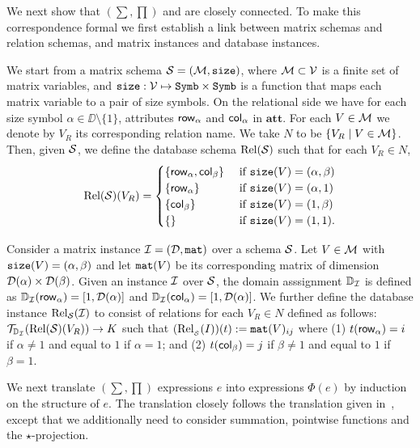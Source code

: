 \newcommand{\remark}[1]{\textcolor{darkgray}{\bf Remark: }\textcolor{gray}{#1} }
We next show that \lang$(\sum,\prod)$ and \ARA are closely connected. To make this correspondence formal we first establish a link between matrix schemas and relation schemas, and matrix instances and database instances. 

We start from a matrix schema $\mathcal{S}=(\mathcal{M},\texttt{size})$, where $\mathcal{M}\subset \mathcal{V}$ is a finite set of matrix variables, and $\texttt{size}: \mathcal{V} \mapsto \texttt{Symb}\times \texttt{Symb}$ is a function that maps each matrix variable to a pair of size symbols. On the relational side
we have for each size symbol $\alpha\in\DD\setminus\{1\}$, attributes $\mathsf{row}_\alpha$ and $\mathsf{col}_\alpha$ in $\mathbf{att}$. For each $V\in\mathcal{M}$ we denote
by $V_R$ its corresponding relation name. We take $N$ to be $\{V_R\mid V\in\mathcal{M}\}$. Then, given $\mathcal{S}$, we define the database  schema $\text{Rel}(\mathcal{S})$ such that for each $V_R\in N$,
\[
	\text{Rel}(\mathcal{S})(V_R) = \begin{cases}
		\lbrace\mathsf{row}_\alpha,\mathsf{col}_\beta \rbrace & \text{ if $ \texttt{size}(V)=(\alpha,\beta)$} \\
		\lbrace\mathsf{row}_\alpha \rbrace & \text{ if $ \texttt{size}(V)=(\alpha,1)$} \\
		\lbrace\mathsf{col}_\beta \rbrace  &
	 \text{ if $ \texttt{size}(V)=(1,\beta)$} \\
		\lbrace\rbrace & \text{ if $\texttt{size}(V)=(1,1)$}.
\end{cases}
\]

Consider a matrix instance $\mathcal{I} = (\mathcal{D},\texttt{mat})$ over a schema $\mathcal{S}$.
Let $V\in\mathcal{M}$ with $\texttt{size}(V)=(\alpha,\beta)$ and let $\texttt{mat}(V)$ be its corresponding matrix of dimension $\mathcal{D}(\alpha)\times \mathcal{D}(\beta)$.
Given an instance $\mathcal{I}$ over $\mathcal{S}$, the domain asssignment $\mathbb{D}_{\mathcal{I}}$ is defined as 
$\mathbb{D}_{\mathcal{I}}(\mathsf{row}_\alpha)=[1,\mathcal{D}(\alpha)]$ and 
$\mathbb{D}_{\mathcal{I}}(\mathsf{col}_\alpha)=[1,\mathcal{D}(\alpha)]$. 
We further  define the database instance $\text{Rel}_{\mathcal{S}}(\mathcal{I})$  to consist of relations for each $V_R\in N$ defined as follows:
$\mathcal{T}_{\mathbb{D}_{\mathcal{I}}}(\text{Rel}(\mathcal{S})(V_R)) \to K$ such that
$(\text{Rel}_{_{\mathcal{S}}}(I))(t):=\texttt{mat}(V)_{ij}$ where (1) $t(\mathsf{row}_\alpha)=i$ if $\alpha\neq 1$ and equal to $1$ if $\alpha = 1$; and (2) $t(\mathsf{col}_\beta)=j$ if $\beta\neq 1$ and equal to $1$ if $\beta= 1$.

We next translate \lang$(\sum,\prod)$ expressions $e$ into \ARA expressions $\Phi(e)$ by induction on the structure of $e$. The translation closely follows the translation given in~\cite{brijder2019matrices}, except that we  additionally need to consider summation, pointwise functions and the $\star$-projection.

